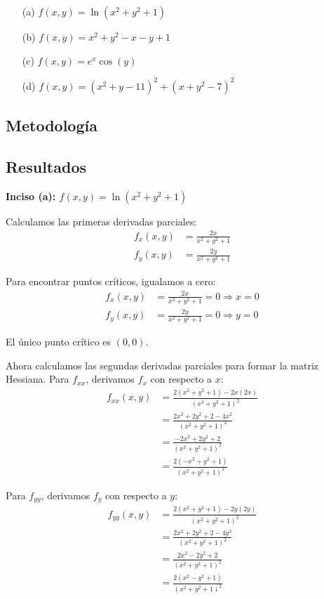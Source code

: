 \documentclass{article}
\begin{document}
\begin{enumerate}
  \item[(a)] $f(x,y) = \ln(x^{2} + y^{2} + 1)$
  \item[(b)] $f(x,y) = x^{2} + y^{2} - x - y + 1$
  \item[(c)] $f(x,y) = e^{x}\cos(y)$
  \item[(d)] $f(x,y) = (x^{2} + y - 11)^{2} + (x + y^{2} - 7)^{2}$
\end{enumerate}

\subsection{Metodología}

\subsection{Resultados}
\setcounter{equation}{0}

\textbf{Inciso (a): $f(x,y) = \ln(x^{2} + y^{2} + 1)$}

Calculamos las primeras derivadas parciales:
\begin{align}
f_x(x,y) &= \frac{2x}{x^2 + y^2 + 1} \\
f_y(x,y) &= \frac{2y}{x^2 + y^2 + 1}
\end{align}

Para encontrar puntos críticos, igualamos a cero:
\begin{align}
f_x(x,y) &= \frac{2x}{x^2 + y^2 + 1} = 0 \Rightarrow x = 0 \\
f_y(x,y) &= \frac{2y}{x^2 + y^2 + 1} = 0 \Rightarrow y = 0
\end{align}

El único punto crítico es $(0,0)$.

Ahora calculamos las segundas derivadas parciales para formar la matriz Hessiana. Para $f_{xx}$, derivamos $f_x$ con respecto a $x$:
\begin{align}
f_{xx}(x,y) &=  \frac{2(x^2 + y^2 + 1) - 2x(2x)}{(x^2 + y^2 + 1)^2} \\
&= \frac{2x^2 + 2y^2 + 2 - 4x^2}{(x^2 + y^2 + 1)^2} \\
&= \frac{-2x^2 + 2y^2 + 2}{(x^2 + y^2 + 1)^2} \\
&= \frac{2(-x^2 + y^2 + 1)}{(x^2 + y^2 + 1)^2}
\end{align}

Para $f_{yy}$, derivamos $f_y$ con respecto a $y$:
\begin{align}
f_{yy}(x,y) &= \frac{2(x^2 + y^2 + 1) - 2y(2y)}{(x^2 + y^2 + 1)^2} \\
&= \frac{2x^2 + 2y^2 + 2 - 4y^2}{(x^2 + y^2 + 1)^2} \\
&= \frac{2x^2 - 2y^2 + 2}{(x^2 + y^2 + 1)^2} \\
&= \frac{2(x^2 - y^2 + 1)}{(x^2 + y^2 + 1)^2}
\end{align}
\end{document}
